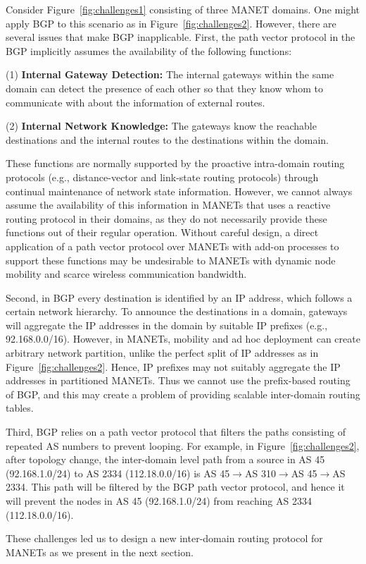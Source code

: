 Consider Figure~\ref{fig:challenges1} consisting of three MANET
domains. One might apply BGP to this scenario as in
Figure~\ref{fig:challenges2}. However, there are several issues that
make BGP inapplicable. First, the path vector protocol in the BGP
implicitly assumes the availability of the following functions:


(1) {\bf Internal Gateway Detection:} The internal gateways within
the same domain can detect the presence of each other so that they
know whom to communicate with about the information of external
routes.


(2) {\bf Internal Network Knowledge:} The gateways know the
reachable destinations and the internal routes to the destinations
within the domain.


These functions are normally supported by the proactive intra-domain
routing protocols (e.g., distance-vector and link-state routing
protocols) through continual maintenance of network state information.
However, we cannot always assume the availability of this information
in MANETs that uses a reactive routing protocol in their
domains, as they do not necessarily provide these functions out of
their regular operation. Without careful design, a direct application
of a path vector protocol over MANETs with add-on processes to support
these functions may be undesirable to MANETs with dynamic node
mobility and scarce wireless communication bandwidth.


Second, in BGP every destination is identified by an IP address, which
follows a certain network hierarchy. To announce the destinations in a
domain, gateways will aggregate the IP addresses in the domain by
suitable IP prefixes (e.g., 92.168.0.0/16).  However, in MANETs,
mobility and ad hoc deployment can create arbitrary network partition,
unlike the perfect split of IP addresses as in
Figure~\ref{fig:challenges2}.  Hence, IP prefixes may not suitably
aggregate the IP addresses in partitioned MANETs. Thus we cannot use
the prefix-based routing of BGP, and this may create a problem of
providing scalable inter-domain routing tables.

Third, BGP relies on a path vector protocol that filters the paths
consisting of repeated AS numbers to prevent looping. For example, in
Figure~\ref{fig:challenges2}, after topology change, the inter-domain
level path from a source in AS 45 (92.168.1.0/24) to AS 2334
(112.18.0.0/16) is AS 45$\to$AS 310$\to$AS 45$\to$AS 2334. This path
will be filtered by the BGP path vector protocol, and hence it will
prevent the nodes in AS 45 (92.168.1.0/24) from reaching AS 2334
(112.18.0.0/16).

These challenges led us to design a new inter-domain routing protocol 
for MANETs as we present in the next section.

